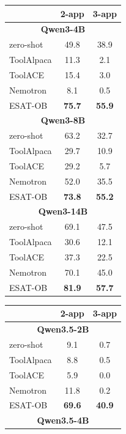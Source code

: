 \begin{table}[t!]
\centering
\footnotesize
\setlength{\tabcolsep}{6pt}
\renewcommand{\arraystretch}{1.1}
\begin{tabular}[b]{lcc}
\toprule
 & \bf{2-app} & \bf{3-app} \\
\midrule
\multicolumn{3}{c}{\bf Qwen3-4B}\\
\midrule
zero-shot   & 49.8 & 38.9 \\
ToolAlpaca  & 11.3 & \phantom{0}2.1 \\
ToolACE     & 15.4 & \phantom{0}3.0 \\
Nemotron    & \phantom{0}8.1 & \phantom{0}0.5 \\
\midrule
ESAT-OB     & \bf 75.7 & \bf 55.9 \\
\midrule
\multicolumn{3}{c}{\bf Qwen3-8B}\\
\midrule
zero-shot   & 63.2 & 32.7 \\
ToolAlpaca  & 29.7 & 10.9 \\
ToolACE     & 29.2 & \phantom{0}5.7 \\
Nemotron    & 52.0 & 35.5 \\
\midrule
ESAT-OB     & \bf 73.8 & \bf 55.2 \\
\midrule
\multicolumn{3}{c}{\bf Qwen3-14B}\\
\midrule
zero-shot   & 69.1 & 47.5 \\
ToolAlpaca  & 30.6 & 12.1 \\
ToolACE     & 37.3 & 22.5 \\
Nemotron    & 70.1 & 45.0 \\
\midrule
ESAT-OB     & \bf 81.9 & \bf 57.7 \\
\bottomrule
\end{tabular}
\hspace{1.5em}
\begin{tabular}[b]{lcc}
\toprule
 & \bf{2-app} & \bf{3-app} \\
\midrule
\multicolumn{3}{c}{\bf Qwen3.5-2B}\\
\midrule
zero-shot   & \phantom{0}9.1 & \phantom{0}0.7 \\
ToolAlpaca  & \phantom{0}8.8 & \phantom{0}0.5 \\
ToolACE     & \phantom{0}5.9 & \phantom{0}0.0 \\
Nemotron    & 11.8 & \phantom{0}0.2 \\
\midrule
ESAT-OB     & \bf 69.6 & \bf 40.9 \\
\midrule
\multicolumn{3}{c}{\bf Qwen3.5-4B}\\

\end{tabular}
\end{table}
